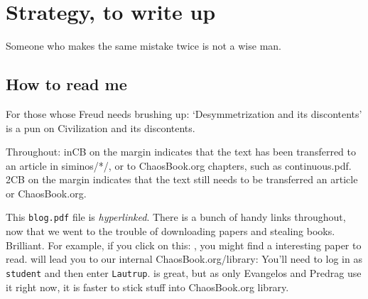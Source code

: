 
\chapter{Strategy, to write up}

\begin{bartlett}{
Someone who makes the same mistake twice is not a wise man.
}
\end{bartlett}




\section{How to read me}

For those whose Freud needs brushing up:
`Desymmetrization and its discontents' is a pun
on 
{Civilization and its discontents}.

Throughout:  {\footnotesize inCB} on the margin                 \inCB
indicates that the text has been transferred to an
article in siminos/*/,  or to ChaosBook.org
chapters, such as
{continuous.pdf}.
 {\footnotesize 2CB} on the margin indicates that the text
still needs to be transferred an article or ChaosBook.org.      \toCB

This \texttt{blog.pdf} file is \emph{hyperlinked}.
There is a bunch of handy links throughout,
now that we went to the trouble of downloading papers and stealing books. Brilliant.
For example, if you click on
this: , you might find a interesting paper to read.
 will
lead you to our internal ChaosBook.org/library:
You'll need to log in as \texttt{student} and then enter \texttt{Lautrup}.
 is great,
but as only Evangelos and Predrag use it right now,
it is faster to stick stuff into ChaosBook.org library.

